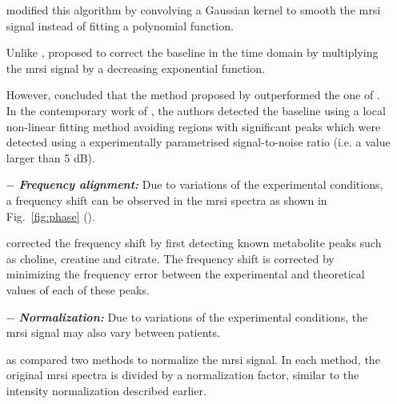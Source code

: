 \begin{enumerate}[leftmargin=*]
\cite{Parfait2012} modified this algorithm by convolving a Gaussian kernel to smooth the \ac{mrsi} signal instead of fitting a polynomial function.%

Unlike \cite{Lieber2003}, \cite{Devos2004} proposed to correct the baseline in the time domain by multiplying the \ac{mrsi} signal by a decreasing exponential function.%
%

However, \cite{Parfait2012} concluded that the method proposed by \cite{Lieber2003} outperformed the one of \cite{Devos2004}. In the contemporary work of \cite{Tiwari2012}, the authors detected the baseline using a local non-linear fitting method avoiding regions with significant peaks which were detected using a experimentally parametrised signal-to-noise ratio (i.e. a value larger than 5 dB).


	\item[$-$] \textbf{\textit{Frequency alignment:}} Due to variations of the experimental conditions, a frequency shift can be observed in the \ac{mrsi} spectra as shown in Fig.~\ref{fig:phase} (\cite{Chen2002,Osorio-Garcia2012}).
	
\cite{Tiwari2012} corrected the frequency shift by first detecting known metabolite peaks such as choline, creatine and citrate. The frequency shift is corrected by minimizing the frequency error between the experimental and theoretical values of each of these peaks.

	\item[$-$] \textbf{\textit{Normalization:}} Due to variations of the experimental conditions, the \ac{mrsi} signal may also vary between patients.
	
\cite{Parfait2012} as \cite{Devos2004} compared two methods to normalize the \ac{mrsi} signal. In each method, the original \ac{mrsi} spectra is divided by a normalization factor, similar to the intensity normalization described earlier. 


\end{enumerate}

